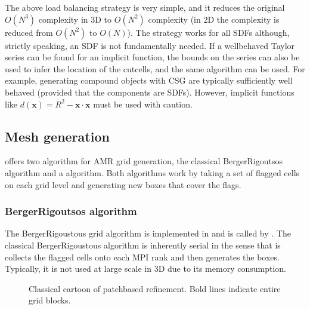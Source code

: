 \documentclass[letterpaper,10pt,english]{sphinxmanual}
\let\sphinxpxdimen\pdfpxdimen\else\newdimen\sphinxpxdimen
\begin{document}
The above load balancing strategy is very simple, and it reduces the original \(O(N^3)\) complexity in 3D to \(O(N^2)\) complexity (in 2D the complexity is reduced from \(O(N^2)\) to \(O(N)\)).
The strategy works for all SDFs although, strictly speaking, an SDF is not fundamentally needed.
If a well\sphinxhyphen{}behaved Taylor series can be found for an implicit function, the bounds on the series can also be used to infer the location of the cut\sphinxhyphen{}cells, and the same algorithm can be used.
For example, generating compound objects with CSG are typically sufficiently well behaved (provided that the components are SDFs).
However, implicit functions like \(d\left(\mathbf{x}\right) = R^2 - \mathbf{x}\cdot\mathbf{x}\) must be used with caution.


\subsection{Mesh generation}
\label{\detokenize{Source/SpatialDiscretization:mesh-generation}}\label{\detokenize{Source/SpatialDiscretization:chap-meshgeneration}}
 offers two algorithm for AMR grid generation, the classical Berger\sphinxhyphen{}Rigoutsos algorithm and a  algorithm.
Both algorithms work by taking a set of flagged cells on each grid level and generating new boxes that cover the flags.


\subsubsection{Berger\sphinxhyphen{}Rigoutsos algorithm}
\label{\detokenize{Source/SpatialDiscretization:berger-rigoutsos-algorithm}}
The Berger\sphinxhyphen{}Rigoustous grid algorithm is implemented in  and is called by .
The classical Berger\sphinxhyphen{}Rigoustous algorithm is inherently serial in the sense that is collects the flagged cells onto each MPI rank and then generates the boxes.
Typically, it is not used at large scale in 3D due to its memory consumption.

\begin{figure}[htb]
\centering
\capstart

\noindent\sphinxincludegraphics[width=240\sphinxpxdimen]{{BRMeshRefine}.png}
\caption{Classical cartoon of patch\sphinxhyphen{}based refinement. Bold lines indicate entire grid blocks.}\label{\detokenize{Source/SpatialDiscretization:id6}}\label{\detokenize{Source/SpatialDiscretization:brmeshrefine}}\end{figure}
\end{document}
